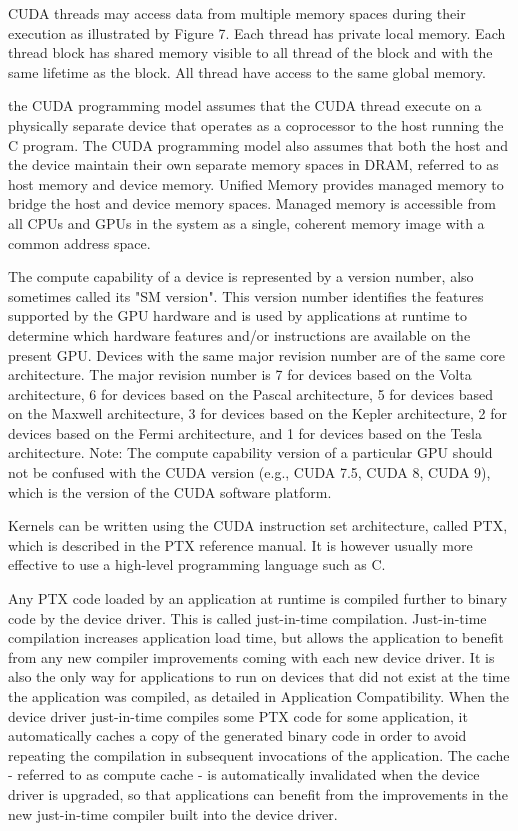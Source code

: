 CUDA threads may access data from multiple memory spaces during 
their execution as illustrated by Figure 7. Each thread has 
private local memory. Each thread block has shared memory visible 
to all thread of the block and with the same lifetime as the 
block. All thread have access to the same global 
memory.~\cite[p.~2.3]{CUDA18}

the CUDA programming model assumes that the CUDA thread execute 
on a physically separate device that operates as a coprocessor to the host 
running the C program. The CUDA programming model also assumes that both the 
host and the device maintain their own separate memory spaces in DRAM, 
referred to as host memory and device memory. Unified Memory provides managed 
memory to bridge the host and device memory spaces. Managed memory is 
accessible from all CPUs and GPUs in the system as a single, coherent memory 
image with a common address space.~\cite[p.~2.4]{CUDA18}

The compute capability of a device is represented by a version number, also 
sometimes called its "SM version". This version number identifies the features 
supported by the GPU hardware and is used by applications at runtime to 
determine which hardware features and/or instructions are available on the 
present GPU. Devices with the same major revision number are of the same core 
architecture. The major revision number is 7 for devices based on the Volta 
architecture, 6 for devices based on the Pascal architecture, 5 for devices 
based on the Maxwell architecture, 3 for devices based on the Kepler 
architecture, 2 for devices based on the Fermi architecture, and 1 for devices 
based on the Tesla architecture. Note: The compute capability version of a 
particular GPU should not be confused with the CUDA version (e.g., CUDA 7.5, 
CUDA 8, CUDA 9), which is the version of the CUDA software 
platform.~\cite[p.~2.4]{CUDA18}

Kernels can be written using the CUDA instruction set architecture, called PTX, 
which is described in the PTX reference manual. It is however usually more 
effective to use a high-level programming language such as 
C.~\cite[p.~3.1]{CUDA18}

Any PTX code loaded by an application at runtime is compiled further to binary 
code by the device driver. This is called just-in-time compilation. 
Just-in-time compilation increases application load time, but allows the 
application to benefit from any new compiler improvements coming with each new 
device driver. It is also the only way for applications to run on devices that 
did not exist at the time the application was compiled, as detailed in 
Application Compatibility. When the device driver just-in-time compiles some 
PTX code for some application, it automatically caches a copy of the generated 
binary code in order to avoid repeating the compilation in subsequent 
invocations of the application. The cache - referred to as compute cache - is 
automatically invalidated when the device driver is upgraded, so that 
applications can benefit from the improvements in the new just-in-time compiler 
built into the device driver.~\cite[p.~3.1.1.2]{CUDA18}

